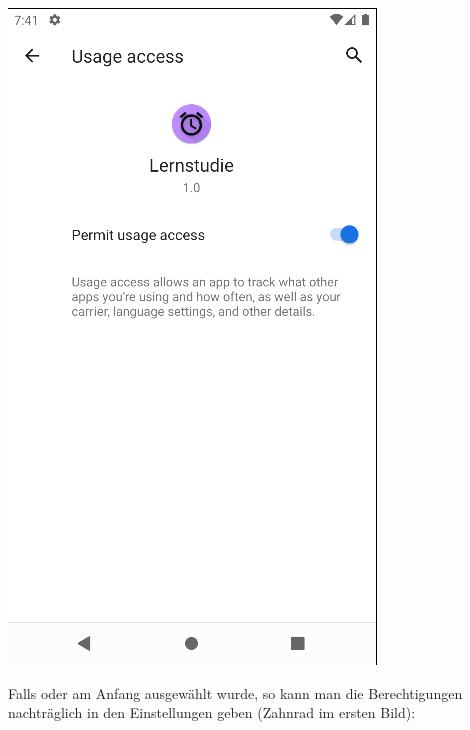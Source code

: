 \documentclass[ngerman]{tutorial}
\begin{document}
\begin{center}
    \includegraphics[scale=0.4]{item_per.png}
\end{center}
Falls  oder  am Anfang ausgewählt wurde, so kann man die Berechtigungen nachträglich in den Einstellungen geben (Zahnrad im ersten Bild):
\end{document}
